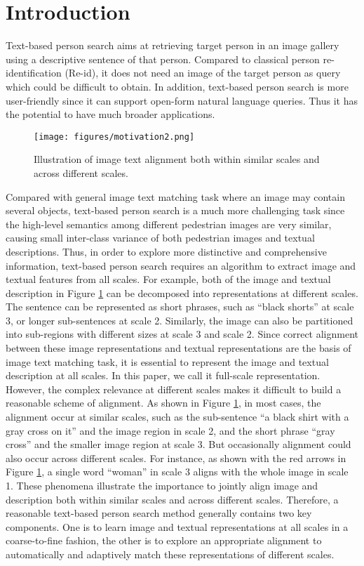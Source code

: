 \documentclass[final]{cvpr}
\begin{document}
\section{Introduction}

Text-based person search aims at retrieving target person in an image gallery using a descriptive sentence of that person. 
Compared to classical person re-identification (Re-id), it does not need an image of the target person as query which could be difficult to obtain. In addition, text-based person search is more user-friendly since it can support open-form natural language queries. Thus it has the potential to have much broader applications. 

\begin{figure}[!t]
\centering
\texttt{[image: figures/motivation2.png]} 
\caption{
Illustration of image text alignment both within similar scales and across different scales. 
} 
\label{fig_motivation}
\end{figure}

Compared with general image text matching task where an image may contain several objects, text-based person search is a much more challenging task since the high-level semantics among different pedestrian images are very similar, causing small inter-class variance of both pedestrian images and textual descriptions. 
Thus, in order to explore more distinctive and comprehensive information, text-based person search requires an algorithm to extract image and textual features from all scales. For example, both of the image and textual description in Figure \ref{fig_motivation} can be decomposed into representations at different scales. 
The sentence can be represented as short phrases, such as ``black shorts'' at scale 3, or longer sub-sentences at scale 2. 
Similarly, the image can also be partitioned into sub-regions with different sizes at scale 3 and scale 2. 
Since correct alignment between these image representations and textual representations are the basis of image text matching task, it is essential to represent the image and textual description at all scales. In this paper, we call it full-scale representation. 
However, the complex relevance at different scales makes it difficult to build a reasonable scheme of alignment. As shown in Figure \ref{fig_motivation}, in most cases, the alignment occur at similar scales, such as the sub-sentence ``a black shirt with a gray cross on it'' and the image region in scale 2, and the short phrase ``gray cross'' and the smaller image region at scale 3. 
But occasionally alignment could also occur across different scales. For instance, as shown with the red arrows in Figure \ref{fig_motivation}, a single word ``woman'' in scale 3 aligns with the whole image in scale 1. 
These phenomena illustrate the importance to jointly align image and description both within similar scales and across different scales. Therefore, a reasonable text-based person search method generally contains two key components. One is to learn image and textual representations at all scales in a coarse-to-fine fashion, the other is to explore an appropriate alignment to automatically and adaptively match these representations of different scales. 
\end{document}
